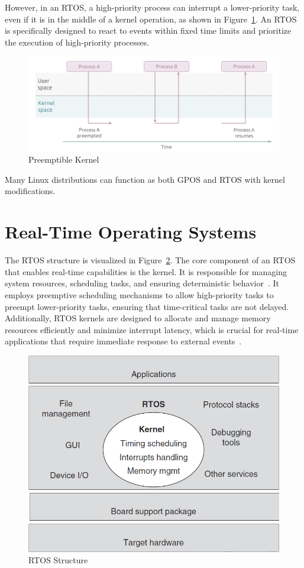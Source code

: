 \documentclass[MMR,Master,english]{style/twbook}
\begin{document}
\noindent However, in an RTOS, a high-priority process can interrupt a lower-priority task, even if it is in the middle of a kernel operation, as shown in Figure~\ref{fig:kernel_rt}. An RTOS is specifically designed to react to events within fixed time limits and prioritize the execution of high-priority processes.

\begin{figure}[H]
	\centering
	\includegraphics[width=0.75\columnwidth]{img/introduction/kernel_rt.png}
	\caption[Preemptible Kernel]{Preemptible Kernel~\cite{WhatRealtimeLinux}}
	\label{fig:kernel_rt}
\end{figure}

\noindent Many Linux distributions can function as both GPOS and RTOS with kernel modifications.

\section{Real-Time Operating Systems}
\noindent The RTOS structure is visualized in Figure~\ref{fig:rtos_structure}. The core component of an RTOS that enables real-time capabilities is the kernel. It is responsible for managing system resources, scheduling tasks, and ensuring deterministic behavior~\cite{malallahComprehensiveStudyKernel2021}. It employs preemptive scheduling mechanisms to allow high-priority tasks to preempt lower-priority tasks, ensuring that time-critical tasks are not delayed. Additionally, RTOS kernels are designed to allocate and manage memory resources efficiently and minimize interrupt latency, which is crucial for real-time applications that require immediate response to external events~\cite{wangRealtimeEmbeddedSystems2017}.

\begin{figure}[H]
	\centering
	\includegraphics[width=0.50\columnwidth]{img/introduction/rtos_structure.png}
	\caption[RTOS Structure]{RTOS Structure~\cite{wangRealtimeEmbeddedSystems2017}}
	\label{fig:rtos_structure}
\end{figure}
\end{document}
